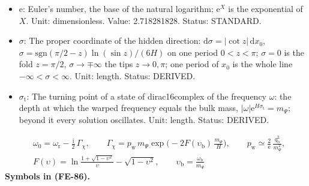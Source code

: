 \documentclass[
  10pt,
]{article}
\begin{document}
\begin{itemize}
  \(\chi_{\mathrm{b}}\): The profile of a state of dirac16complex at the
  fold (a resonance): it decays as
  \(\mathrm{e}^{-q_{\mathrm{b}}\lvert\sigma\rvert}\) out to the turning
  point and continues beyond it as an outgoing wave of exponentially
  small amplitude. Unit: GeV\(^{2}\). Status: DERIVED.
\item
  \(\mathrm{e}\): Euler's number, the base of the natural logarithm;
  \(\mathrm{e}^{X}\) is the exponential of \(X\). Unit: dimensionless.
  Value: 2.718281828. Status: STANDARD.
\item
  \(\sigma\): The proper coordinate of the hidden direction:
  \(\mathrm{d}\sigma = \lvert\cot z\rvert\,\mathrm{d}x_0\),
  \(\sigma = \mathrm{sgn}(\pi/2 - z)\ln(\sin z)/(6H)\) on one period
  \(0 < z < \pi\); \(\sigma = 0\) is the fold \(z = \pi/2\),
  \(\sigma \to \mp\infty\) the tips \(z \to 0, \pi\); one period of
  \(x_0\) is the whole line \(-\infty < \sigma < \infty\). Unit: length.
  Status: DERIVED.
\item
  \(\sigma_{\mathrm{t}}\): The turning point of a state of
  dirac16complex of the frequency \(\omega\): the depth at which the
  warped frequency equals the bulk mass,
  \(\lvert\omega\rvert\mathrm{e}^{H\sigma_{\mathrm{t}}} = m_\Psi\);
  beyond it every solution oscillates. Unit: length. Status: DERIVED.
\end{itemize}

\[
\begin{aligned}
&\omega_0 = \omega_{\mathrm{r}} - \frac{\mathrm{i}}{2}\,\Gamma_\chi,\qquad
\Gamma_\chi = p_{\mathrm{w}}\,m_\Psi\exp\Big(-2F(\upsilon_{\mathrm{b}})\,\frac{m_\Psi}{H}\Big),\qquad
p_{\mathrm{w}} \simeq \frac{2}{\mathrm{e}}\,\frac{q_{\mathrm{b}}^2}{m_\Psi^2},\\
&F(\upsilon) = \ln\frac{1 + \sqrt{1 - \upsilon^2}}{\upsilon} - \sqrt{1 - \upsilon^2},\qquad \upsilon_{\mathrm{b}} = \frac{\omega_{\mathrm{b}}}{m_\Psi}
\end{aligned} \tag{FE-86}
\] \textbf{Symbols in (FE-86).}
\end{document}

